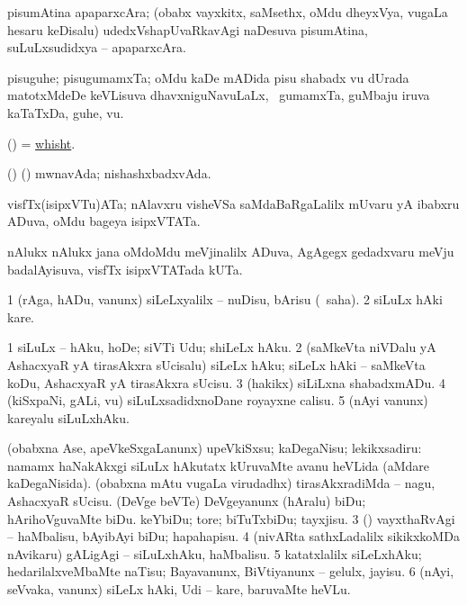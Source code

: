 \noindent
\gl{\pagu}
\bmng
{} pisumAtina apaparxcAra; (obabx vayxkitx, saMsethx, oMdu dheyxVya, \mo vugaLa hesaru keDisalu) udedxVshapUvaRkavAgi naDesuva pisumAtina, suLuLxsudidxya -- apaparxcAra. 
\emng
\eentry

\bentry
{}
\gl{\nA}
\bmng
pisuguhe; pisugumamxTa; oMdu kaDe mADida pisu shabadx \mo vu dUrada matotxMdeDe keVLisuva dhavxniguNavuLaLx, \sA\ gumamxTa, guMbaju iruva kaTaTxDa, guhe, \mo vu. 
\emng
\eentry

\bentry
{} 
\gl{\kirx}
\expl{}
\bmng
(\birx) = \hyperlink{whisht}{whisht}. 
\emng
\eentry

\bentry
{} 
\gl{\gu}
\bmng
(\birx) (\pArxparx) mwnavAda; nishashxbadxvAda. 
\emng
\eentry

\bentry
{} 
\gl{\nA}
\expl{}
\bmng
visfTx(isipxVTu)ATa; nAlavxru visheVSa saMdaBaRgaLalilx mUvaru yA ibabxru ADuva, oMdu bageya isipxVTATa. 
\emng
\eentry

\bentry
{}
\gl{\nA}
\bmng
nAlukx nAlukx jana oMdoMdu meVjinalilx ADuva, AgAgegx gedadxvaru meVju badalAyisuva, visfTx isipxVTATada kUTa. 
\emng
\eentry

\bentry
{} 
\gl{\sakirx}
\expl{}
\bmng
\bnum
\num{1} (rAga, hADu, \mo vanunx) siLeLxyalilx -- nuDisu, bArisu (\akirx\ saha). 
\num{2} siLuLx hAki kare. 
\enum
\emng

\noindent 
\gl{\akirx}
\expl{}
\bmng
\bnum
\num{1} siLuLx -- hAku, hoDe; siVTi Udu; shiLeLx hAku. 
\num{2} (saMkeVta niVDalu yA AshacxyaR yA tirasAkxra sUcisalu) siLeLx hAku; siLeLx hAki -- saMkeVta koDu, AshacxyaR yA tirasAkxra sUcisu. 
\num{3} (hakikx) siLiLxna shabadxmADu. 
\num{4} (kiSxpaNi, gALi, \mo vu) siLuLxsadidxnoDane royayxne calisu. 
\num{5} (nAyi \mo vanunx) kareyalu siLuLxhAku. 
\enum
\emng

\noindent
\gl{\pagu}
\bmng
\bnum
{}  
\banum
{} (obabxna Ase, apeVkeSxgaLanunx) upeVkiSxsu; kaDegaNisu; lekikxsadiru:  namamx haNakAkxgi siLuLx hAkutatx kUruvaMte avanu heVLida (aMdare kaDegaNisida). 
 (obabxna mAtu \mo vugaLa virudadhx) tirasAkxradiMda -- nagu, AshacxyaR sUcisu. 
\eanum
\numie
{}  
\banum
{} (DeVge beVTe) DeVgeyanunx (hAralu) biDu; hArihoVguvaMte biDu. 
 keYbiDu; tore; biTuTxbiDu; tayxjisu. 
\eanum
\numie
\num{3}  (\AmA) vayxthaRvAgi -- haMbalisu, bAyibAyi biDu; hapahapisu. 
\num{4}  (nivARta sathxLadalilx sikikxkoMDa nAvikaru) gALigAgi -- siLuLxhAku, haMbalisu. 
\num{5}  katatxlalilx siLeLxhAku; hedarilalxveMbaMte naTisu; Bayavanunx, BiVtiyanunx -- gelulx, jayisu. 
\num{6}  (nAyi, seVvaka, \mo vanunx) siLeLx hAki, Udi -- kare, baruvaMte heVLu. 
\enum
\emng
\eentry

